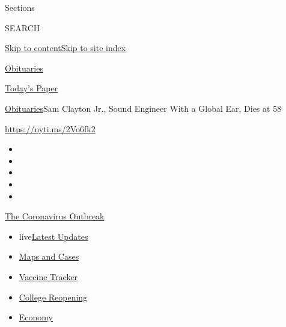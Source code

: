 Sections

SEARCH

\protect\hyperlink{site-content}{Skip to
content}\protect\hyperlink{site-index}{Skip to site index}

\href{https://www.nytimes.com/section/obituaries}{Obituaries}

\href{https://myaccount.nytimes.com/auth/login?response_type=cookie\&client_id=vi}{}

\href{https://www.nytimes.com/section/todayspaper}{Today's Paper}

\href{/section/obituaries}{Obituaries}\textbar{}Sam Clayton Jr., Sound
Engineer With a Global Ear, Dies at 58

\url{https://nyti.ms/2Vo6fk2}

\begin{itemize}
\item
\item
\item
\item
\item
\end{itemize}

\href{https://www.nytimes.com/news-event/coronavirus?action=click\&pgtype=Article\&state=default\&region=TOP_BANNER\&context=storylines_menu}{The
Coronavirus Outbreak}

\begin{itemize}
\tightlist
\item
  live\href{https://www.nytimes.com/2020/08/03/world/coronavirus-covid-19.html?action=click\&pgtype=Article\&state=default\&region=TOP_BANNER\&context=storylines_menu}{Latest
  Updates}
\item
  \href{https://www.nytimes.com/interactive/2020/us/coronavirus-us-cases.html?action=click\&pgtype=Article\&state=default\&region=TOP_BANNER\&context=storylines_menu}{Maps
  and Cases}
\item
  \href{https://www.nytimes.com/interactive/2020/science/coronavirus-vaccine-tracker.html?action=click\&pgtype=Article\&state=default\&region=TOP_BANNER\&context=storylines_menu}{Vaccine
  Tracker}
\item
  \href{https://www.nytimes.com/2020/08/02/us/covid-college-reopening.html?action=click\&pgtype=Article\&state=default\&region=TOP_BANNER\&context=storylines_menu}{College
  Reopening}
\item
  \href{https://www.nytimes.com/live/2020/08/03/business/stock-market-today-coronavirus?action=click\&pgtype=Article\&state=default\&region=TOP_BANNER\&context=storylines_menu}{Economy}
\end{itemize}

